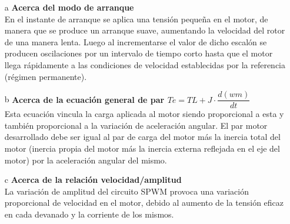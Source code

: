 \documentclass[11pt, a4paper]{article}
\begin{document}
\begin{itemize}
\item[a] \textbf{Acerca del modo de arranque}\\
En el instante de arranque se aplica una tensión pequeña en el motor, de
manera que se produce un arranque suave, aumentando la velocidad del rotor
de una manera lenta. Luego al incrementarse el valor de dicho escalón se
producen oscilaciones por un intervalo de tiempo corto hasta que el motor
llega rápidamente a las condiciones de velocidad establecidas por la referencia (régimen
permanente).

\item[b] \textbf{Acerca de la ecuación general de par  $Te=TL+J\cdot \dfrac{d(wm)}{dt} $}\\
Esta ecuación vincula la carga aplicada al motor siendo
proporcional a esta y también  proporcional a la variación de aceleración
angular. El par motor desarrollado debe ser igual al par de carga del motor
más la inercia total del motor (inercia propia del motor más la inercia
externa reflejada en el eje del motor) por la aceleración angular del mismo.

\item[c] \textbf{Acerca de la relación velocidad/amplitud}\\
La variación de amplitud del circuito SPWM provoca una variación
proporcional de velocidad en el motor, debido al aumento de la tensión
eficaz en cada devanado y la corriente de los mismos.
\end{itemize}
\end{document}
